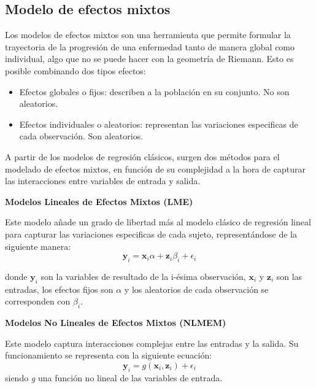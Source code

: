 	\subsection{Modelo de efectos mixtos}
	Los modelos de efectos mixtos son una herramienta que permite formular la trayectoria de la progresión de una enfermedad tanto de manera global como individual, algo que no se puede hacer con la geometría de Riemann. Esto es posible combinando dos tipos efectos:
	\begin{itemize}
		\item Efectos globales o fijos: describen a la población en su conjunto. No son aleatorios.
		\item Efectos individuales o aleatorios: representan las variaciones especificas de cada observación. Son aleatorios.
	\end{itemize}
	
	A partir de los modelos de regresión clásicos, surgen dos métodos para el modelado de efectos mixtos, en función de su complejidad a la hora de capturar las interacciones entre variables de entrada y salida.
	
	
	\begin{description}
		\item {\textbf{Modelos Lineales de Efectos Mixtos (LME)}}
		
		Este modelo añade un grado de libertad más al modelo clásico de regresión lineal para capturar las variaciones especificas de cada sujeto, representándose de la siguiente manera:\\
		\begin{equation}
			\textbf{y}_{i}=\textbf{x}_{i}\alpha+\textbf{z}_{i}\beta_{i}+\epsilon_{i}
		\end{equation}
		
		donde $\textbf{y}_{i}$ son la variables de resultado de la i-ésima observación, $\textbf{x}_{i}$ y $\textbf{z}_{i}$ son las entradas, los efectos fijos son $\alpha$ y los aleatorios de cada observación se corresponden con $\beta_{i}$.
		
		\item{\textbf{Modelos No Lineales de Efectos Mixtos (NLMEM)}}
		
		Este modelo captura interacciones complejas entre las entradas y la salida. Su funcionamiento se representa con la siguiente ecuación:
		\begin{equation}
			\textbf{y}_{i}=g(\textbf{x}_{i},\textbf{z}_{i})+\epsilon_{i}
		\end{equation}
		siendo \textit{g} una función no lineal de las variables de entrada.
	\end{description}
	
